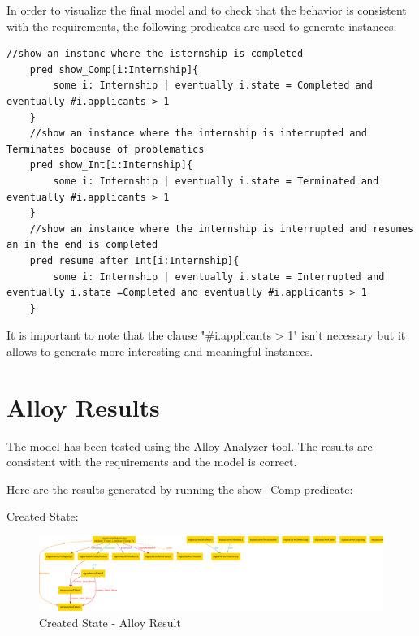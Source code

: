 \par In order to visualize the final model and to check that the behavior is consistent with the requirements, the
following predicates are used to generate instances:

\begin{lstlisting}[language= Alloy]
    //show an instanc where the isternship is completed
    pred show_Comp[i:Internship]{
        some i: Internship | eventually i.state = Completed and eventually #i.applicants > 1
    }
    //show an instance where the internship is interrupted and Terminates bocause of problematics
    pred show_Int[i:Internship]{
        some i: Internship | eventually i.state = Terminated and eventually #i.applicants > 1
    }
    //show an instance where the internship is interrupted and resumes an in the end is completed
    pred resume_after_Int[i:Internship]{
        some i: Internship | eventually i.state = Interrupted and  eventually i.state =Completed and eventually #i.applicants > 1
    }
\end{lstlisting}

\par It is important to note that the clause "\#i.applicants > 1" isn't necessary but it allows to generate more
interesting and meaningful instances.

\section{Alloy Results}%
\label{sec:Alloy-Results}%

\par The model has been tested using the Alloy Analyzer tool. The results are consistent with the requirements and the
model is correct.

\par Here are the results generated by running the show\_Comp predicate:

\par Created State:

\begin{figure}[H]
    \centering
    \includegraphics[width=1\textwidth,height=0.3\textheight]{Images/Alloy_images/Alloy_1-1.pdf}
    \caption{Created State - Alloy Result}
\end{figure}

